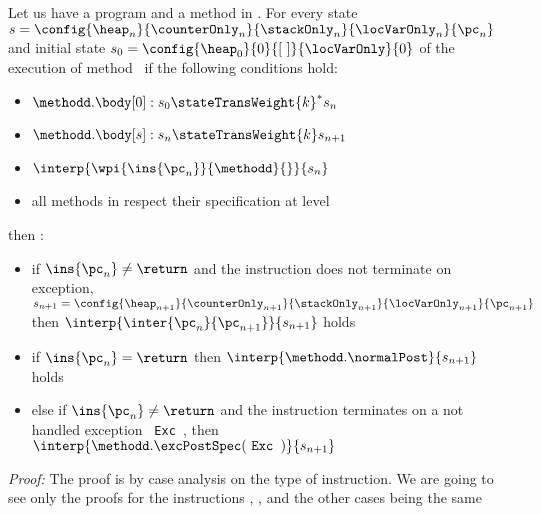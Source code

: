 \begin{lemma} \label{lemma0}
Let us have a program \Program{} and a method \methodd{} in \Program.
For every state $s =\config{\heap_n }{\counterOnly_n }{\stackOnly_n }{\locVarOnly_n }{\pc_n } $ and
initial state $s_{0} =\config{\heap_{0}  }{ 0 }{\lbrack \ \rbrack }{\locVarOnly }{ 0 } $ 
   of the execution of method \methodd \  if the following conditions hold: 
 \begin{itemize}
         \item $ \methodd.\body[0] : s_{0} \stateTransWeight{k}^{*} s_n$
         \item $ \methodd.\body[s] : s_n \stateTransWeight{k} s_{n+1}$
         \item $ \interp{\wpi{\ins{\pc_n}}{\methodd}{}}{s_n} $
	 \item all methods in \Program{} respect their specification at level   
 \end{itemize}
  
  then : 
 \begin{itemize}
         \item if  $ \ins{\pc_n} \neq \return $ and the instruction does not terminate on exception,
	      $ s_{n+1} = \config{\heap_{n+1} }{\counterOnly_{n+1} }{ \stackOnly_{n+1}}{\locVarOnly_{n+1} }{ \pc_{n+1} }  $
	       then  $ \interp{\inter{\pc_n}{\pc_{n+1}}}{s_{n+1}}  $   holds 
        \item if  $ \ins{\pc_n} = \return $ then  $ \interp{\methodd.\normalPost}{s_{n+1}}  $   holds
	\item else if $ \ins{\pc_n } \neq \return $ and the instruction terminates on a not handled exception \mbox{ \rm\texttt{Exc }}, then
	      $ \interp{\methodd.\excPostSpec( \mbox{ \rm\texttt{Exc }} )}{ s_{n+1} }  $ 
	
  \end{itemize} 
\end{lemma}
\textit{Proof:}
The proof is by case analysis on the type of instruction. %
We are going to see only the proofs for the instructions \return , \load, \new{} and \putfield{} the other cases being the same
